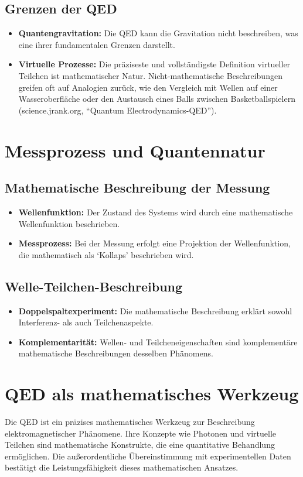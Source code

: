 \documentclass[12pt,a4paper]{article}
\begin{document}
	\subsection{Grenzen der QED}
	\begin{itemize}
		\item \textbf{Quantengravitation:} Die QED kann die Gravitation nicht beschreiben, was eine ihrer fundamentalen Grenzen darstellt.
		\item \textbf{Virtuelle Prozesse:} Die präziseste und vollständigste Definition virtueller Teilchen ist mathematischer Natur. Nicht-mathematische Beschreibungen greifen oft auf Analogien zurück, wie den Vergleich mit Wellen auf einer Wasseroberfläche oder den Austausch eines Balls zwischen Basketballspielern (science.jrank.org, ``Quantum Electrodynamics-QED'').
	\end{itemize}
	
	\section{Messprozess und Quantennatur}
	\subsection{Mathematische Beschreibung der Messung}
	\begin{itemize}
		\item \textbf{Wellenfunktion:} Der Zustand des Systems wird durch eine mathematische Wellenfunktion beschrieben.
		\item \textbf{Messprozess:} Bei der Messung erfolgt eine Projektion der Wellenfunktion, die mathematisch als `Kollaps' beschrieben wird.
	\end{itemize}
	
	\subsection{Welle-Teilchen-Beschreibung}
	\begin{itemize}
		\item \textbf{Doppelspaltexperiment:} Die mathematische Beschreibung erklärt sowohl Interferenz- als auch Teilchenaspekte.
		\item \textbf{Komplementarität:} Wellen- und Teilcheneigenschaften sind komplementäre mathematische Beschreibungen desselben Phänomens.
	\end{itemize}
	
	\section{QED als mathematisches Werkzeug}
	Die QED ist ein präzises mathematisches Werkzeug zur Beschreibung elektromagnetischer Phänomene. Ihre Konzepte wie Photonen und virtuelle Teilchen sind mathematische Konstrukte, die eine quantitative Behandlung ermöglichen. Die außerordentliche Übereinstimmung mit experimentellen Daten bestätigt die Leistungsfähigkeit dieses mathematischen Ansatzes.
	
\end{document}
